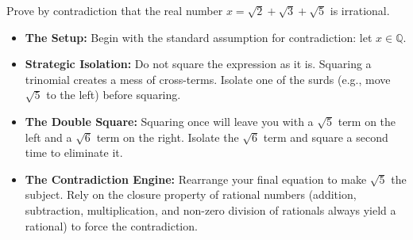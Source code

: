 
\begin{problem}
Prove by contradiction that the real number $x = \sqrt{2} + \sqrt{3} + \sqrt{5}$ is irrational.
\end{problem}

\begin{hint}
\begin{itemize}
    \item \textbf{The Setup:} Begin with the standard assumption for contradiction: let $x \in \mathbb{Q}$.
    \item \textbf{Strategic Isolation:} Do not square the expression as it is. Squaring a trinomial creates a mess of cross-terms. Isolate one of the surds (e.g., move $\sqrt{5}$ to the left) before squaring.
    \item \textbf{The Double Square:} Squaring once will leave you with a $\sqrt{5}$ term on the left and a $\sqrt{6}$ term on the right. Isolate the $\sqrt{6}$ term and square a second time to eliminate it.
    \item \textbf{The Contradiction Engine:} Rearrange your final equation to make $\sqrt{5}$ the subject. Rely on the closure property of rational numbers (addition, subtraction, multiplication, and non-zero division of rationals always yield a rational) to force the contradiction.
\end{itemize}
\end{hint}

